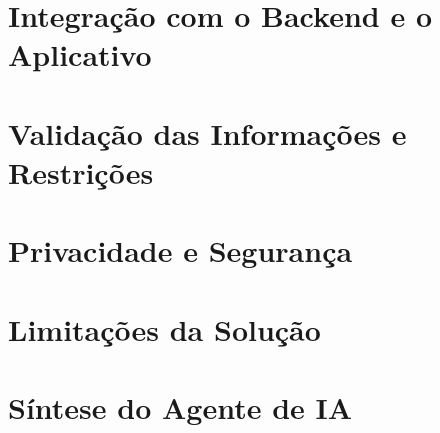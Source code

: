 
\section{Integração com o Backend e o Aplicativo}
\label{sec:integracao-agente-ia}


\section{Validação das Informações e Restrições}
\label{sec:validacao-agente-ia}


\section{Privacidade e Segurança}
\label{sec:privacidade-agente-ia}


\section{Limitações da Solução}
\label{sec:limitacoes-agente-ia}


\section{Síntese do Agente de IA}
\label{sec:sintese-agente-ia}

